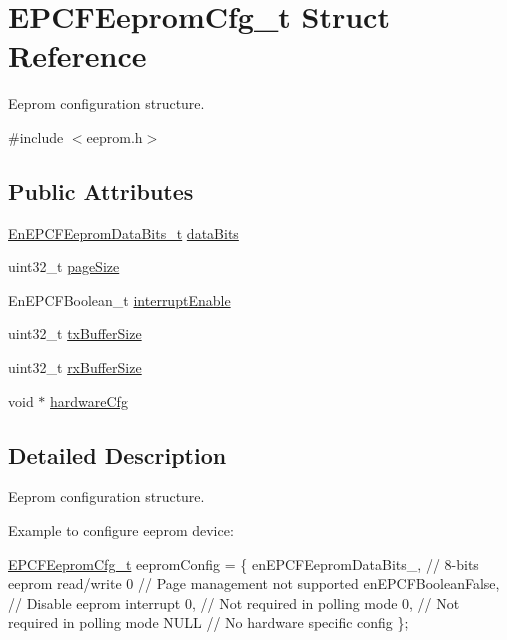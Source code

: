\hypertarget{structEPCFEepromCfg__t}{}\section{E\+P\+C\+F\+Eeprom\+Cfg\+\_\+t Struct Reference}
\label{structEPCFEepromCfg__t}


Eeprom configuration structure.  




{\ttfamily \#include $<$eeprom.\+h$>$}

\subsection*{Public Attributes}
\begin{DoxyCompactItemize}
\item 
\mbox{\hyperlink{eeprom_8h_a26c17a51454c6b39295cc9af35b810cf}{En\+E\+P\+C\+F\+Eeprom\+Data\+Bits\+\_\+t}} \mbox{\hyperlink{structEPCFEepromCfg__t_a2df32d2647aea4190071c430fc042003}{data\+Bits}}
\item 
uint32\+\_\+t \mbox{\hyperlink{structEPCFEepromCfg__t_a462a915bfc7d129c2a2a2c2a56ef1e76}{page\+Size}}
\item 
En\+E\+P\+C\+F\+Boolean\+\_\+t \mbox{\hyperlink{structEPCFEepromCfg__t_aff554b4f8578e7c7b3d21e6bd9827bd0}{interrupt\+Enable}}
\item 
uint32\+\_\+t \mbox{\hyperlink{structEPCFEepromCfg__t_a1e30b87160004affb4bb696a63c0c570}{tx\+Buffer\+Size}}
\item 
uint32\+\_\+t \mbox{\hyperlink{structEPCFEepromCfg__t_aec738dcc2cd2beb6e067d0500e183908}{rx\+Buffer\+Size}}
\item 
void $\ast$ \mbox{\hyperlink{structEPCFEepromCfg__t_a015739caea799b952ecc27c7137244c6}{hardware\+Cfg}}
\end{DoxyCompactItemize}


\subsection{Detailed Description}
Eeprom configuration structure. 

Example to configure eeprom device\+:

\mbox{\hyperlink{structEPCFEepromCfg__t}{E\+P\+C\+F\+Eeprom\+Cfg\+\_\+t}} eeprom\+Config = \{ en\+E\+P\+C\+F\+Eeprom\+Data\+Bits\+\_, // 8-\/bits eeprom read/write 0 // Page management not supported en\+E\+P\+C\+F\+Boolean\+False, // Disable eeprom interrupt 0, // Not required in polling mode 0, // Not required in polling mode N\+U\+LL // No hardware specific config \}; 

